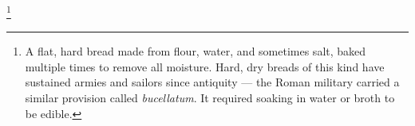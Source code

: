 \footnote{A flat, hard bread made from flour, water, and sometimes salt, baked multiple times to remove all moisture. Hard, dry breads of this kind have sustained armies and sailors since antiquity — the Roman military carried a similar provision called \textit{bucellatum}. It required soaking in water or broth to be edible.}